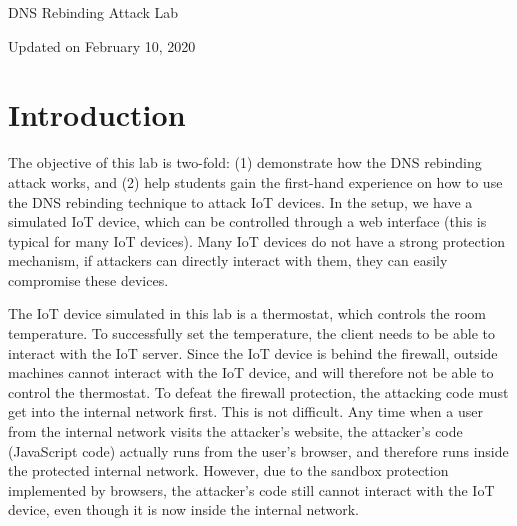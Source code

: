 



\newcommand{\rebindingFigs}{./Figs}





\begin{center}
{\LARGE DNS Rebinding Attack Lab}

\vspace{0.05in}
Updated on February 10, 2020
\end{center}



\setcounter{task}{1}
\newcommand{\tasks} {\bf {\noindent (\arabic{task})} \addtocounter{task}{1} \,}



\section{Introduction}


The objective of this lab is two-fold: (1) demonstrate how 
the DNS rebinding attack works, and (2) help students gain
the first-hand experience on how to use the DNS rebinding
technique to attack IoT devices. In the setup, we have a simulated IoT device, 
which can be controlled through
a web interface (this is typical for many IoT devices). Many IoT devices do not have 
a strong protection mechanism, if attackers can directly interact with them, they can
easily compromise these devices. 


The IoT device simulated in this lab is a thermostat, 
which controls the room temperature. 
To successfully set the temperature, the client needs to be able to interact with the
IoT server. Since the IoT device is behind the firewall, outside machines
cannot interact with the IoT device, and will therefore not be able to 
control the thermostat. To defeat the firewall protection, the attacking code must get into the 
internal network first. This is not difficult. Any time when a user from 
the internal network visits the attacker's website, the attacker's code (JavaScript
code) actually runs from the user's browser, and therefore runs inside the 
protected internal network. However, due to the sandbox protection implemented 
by browsers, the attacker's code still cannot interact with the IoT device, even though it 
is now inside the internal network. 


